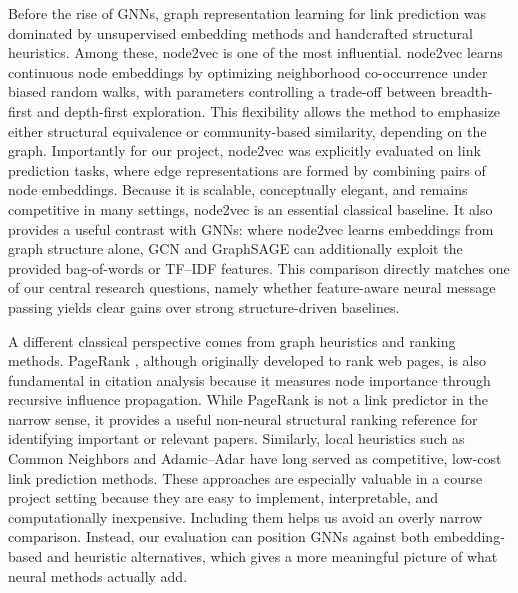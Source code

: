 \documentclass[11pt,a4paper]{article}
\begin{document}
Before the rise of GNNs, graph representation learning for link prediction
was dominated by unsupervised embedding methods and handcrafted structural heuristics.
Among these, node2vec \cite{grover2016node2vec} is one of the most influential.
node2vec learns continuous node embeddings by optimizing neighborhood co-occurrence
under biased random walks, with parameters controlling a trade-off between breadth-first
and depth-first exploration.
This flexibility allows the method to emphasize either structural equivalence
or community-based similarity, depending on the graph.
Importantly for our project, node2vec was explicitly evaluated on link prediction tasks,
where edge representations are formed by combining pairs of node embeddings.
Because it is scalable, conceptually elegant, and remains competitive in many settings,
node2vec is an essential classical baseline.
It also provides a useful contrast with GNNs:
where node2vec learns embeddings from graph structure alone,
GCN and GraphSAGE can additionally exploit the provided bag-of-words or TF--IDF features.
This comparison directly matches one of our central research questions,
namely whether feature-aware neural message passing yields clear gains
over strong structure-driven baselines.

A different classical perspective comes from graph heuristics and ranking methods.
PageRank \cite{page1999pagerank}, although originally developed to rank web pages,
is also fundamental in citation analysis because it measures node importance
through recursive influence propagation.
While PageRank is not a link predictor in the narrow sense,
it provides a useful non-neural structural ranking reference for identifying important or relevant papers.
Similarly, local heuristics such as Common Neighbors and Adamic--Adar
have long served as competitive, low-cost link prediction methods.
These approaches are especially valuable in a course project setting
because they are easy to implement, interpretable, and computationally inexpensive.
Including them helps us avoid an overly narrow comparison.
Instead, our evaluation can position GNNs against both embedding-based and heuristic alternatives,
which gives a more meaningful picture of what neural methods actually add.
\end{document}
